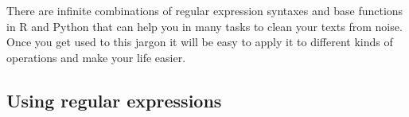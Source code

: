 
There are infinite combinations of regular expression syntaxes and base functions in R and Python that can help you in many tasks to clean your texts from noise. Once you get used to this jargon it will be easy to apply it to different kinds of operations and make your life easier.

\subsection{Using regular expressions}



